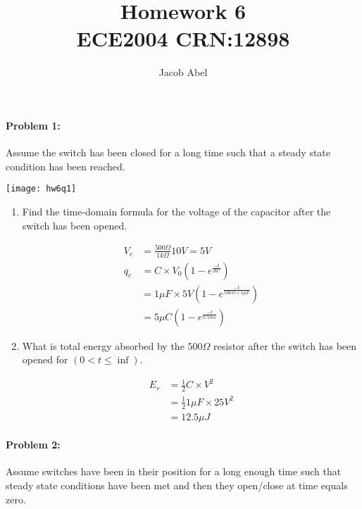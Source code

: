\documentclass[12pt,letterpaper,titlepage]{article}
\author{Jacob Abel}
\title{	Homework 6
	\\\large ECE2004 CRN:12898
}
\begin{document}
\maketitle
\begin{raggedright}

\paragraph{Problem 1: }
Assume the switch has been closed for a long time such that a steady state condition has been reached.

\begin{center}
\texttt{[image: hw6q1]}
\end{center}

\begin{enumerate}[label=\alph*)]
\item Find the time-domain formula for the voltage of the capacitor after the switch has been opened.

\begin{align*}
V_c &= \frac{500\Omega}{1k\Omega}10V = 5V
\\ q_c &= C \times V_0(1-e^{\frac{-t}{RC}})
\\     &= 1\mu F \times 5V(1-e^{\frac{-t}{500\Omega\times 1\mu F}})
\\     &= 5\mu C(1-e^{\frac{-t}{0.5ms}})
\end{align*}

\item What is total energy absorbed by the $500\Omega$ resistor after the switch has been opened for $(0 < t \leq \inf)$.

\begin{align*}
   E_r &= \frac{1}{2} C \times V^2
\\     &= \frac{1}{2} 1\mu F \times 25V^2
\\     &= 12.5\mu J
\end{align*}

\end{enumerate}


\clearpage

\paragraph{Problem 2: }
Assume switches have been in their position for a long enough time such that steady state conditions have been met and then they open/close at time equals zero.


\end{raggedright}
\end{document}
